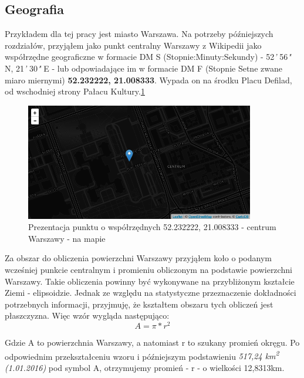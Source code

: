 

\subsection{Geografia}
Przykładem dla tej pracy jest miasto Warszawa. Na potrzeby późniejszych rozdziałów, przyjąłem jako punkt centralny Warszawy z Wikipedii\cite{WarszawaWiki} jako współrzędne geograficzne w formacie DM S (Stopnie:Minuty:Sekundy) - 52\textit{'} 56\textit{"} N, 21\textit{'} 30\textit{"} E - lub odpowiadające im w formacie DM F (Stopnie Setne zwane miaro miernymi) \textbf{52.232222, 21.008333}. Wypada on na środku Placu Defilad, od wschodniej strony Pałacu Kultury.\ref{fig:warsawCenter}

\begin{figure}[h!]
  \centering
    \includegraphics[width=10cm]{images/warsaw-center}
  \caption{Prezentacja punktu o współrzędnych 52.232222, 21.008333 - centrum Warszawy - na mapie}
  \label{fig:warsawCenter}
\end{figure}


Za obszar do obliczenia powierzchni Warszawy przyjąłem koło o podanym wcześniej punkcie centralnym i promieniu obliczonym na podstawie powierzchni Warszawy\cite{WarszawaWiki}. Takie obliczenia powinny być wykonywane na przybliżonym kształcie Ziemi - elipsoidzie. Jednak ze względu na statystyczne przeznaczenie dokładności potrzebnych informacji, przyjmuję, że kształtem obszaru tych obliczeń jest płaszczyzna. Więc wzór wygląda następująco:
\[ A=\pi*r^2 \]

Gdzie A to powierzchnia Warszawy, a natomiast r to szukany promień okręgu. Po odpowiednim przekształceniu wzoru i późniejszym podstawieniu \textit{517,24 km\textsuperscript{2} (1.01.2016)}\cite{WarszawaWiki} pod symbol A, otrzymujemy promień - r - o wielkości 12,8313km.


